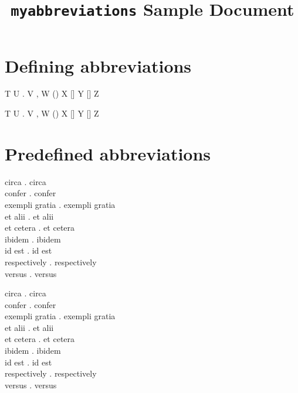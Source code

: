 \documentclass{article}
\begin{document}
\title{\texttt{myabbreviations} Sample Document}
\author{}
\date{}

\maketitle

\begin{verbatim*}
\usepackage[hyperref,italics]{myabbreviations}
\usepackage{hyperref}
\end{verbatim*}

\section{Defining abbreviations}

\begin{verbatim*}
\DeclareAbbreviation{}
T \abc U \abc. V \abc, W (\abc) X [\abc] Y [\abc{}] Z
\end{verbatim*}
%
\DeclareAbbreviation{}
T \abc U \abc. V \abc, W (\abc) X [\abc] Y [\abc{}] Z

\section{Predefined abbreviations}

\begin{verbatim*}
\ca circa \ca. circa\\
\cf confer \cf. confer\\
\eg exempli gratia \eg. exempli gratia\\
\etal et alii \etal. et alii\\
\etc et cetera \etc. et cetera\\
\ibid ibidem \ibid. ibidem\\
\ie id est \ie. id est\\
\resp respectively \resp. respectively\\
\vs versus \vs. versus
\end{verbatim*}
%
\ca circa \ca. circa \\
\cf confer \cf. confer \\
\eg exempli gratia \eg. exempli gratia \\
\etal et alii \etal. et alii \\
\etc et cetera \etc. et cetera \\
\ibid ibidem \ibid. ibidem \\
\ie id est \ie. id est \\
\resp respectively \resp. respectively \\
\vs versus \vs. versus
\end{document}
